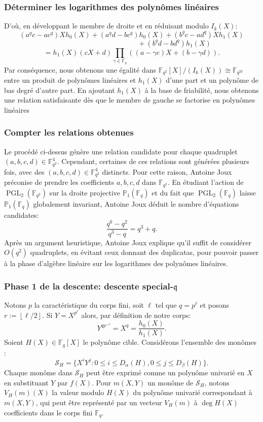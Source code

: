 \documentclass{beamer}
\theoremstyle{definition}
\theoremstyle{remark}
\def\O{O}
\def\gf #1{\mathbb{F}_{#1}}
\def\floor #1{\left\lfloor#1\right\rfloor}
\begin{document}
\begin{frame}
  \frametitle{Déterminer les logarithmes des polynômes linéaires}
  D'où, en développant le membre de droite et en réduisant modulo $I_k(X)$:
  $$(a^qc - ac^q)Xh_0(X) + (a^qd - bc^q)h_0(X) + (b^qc - ad^q)Xh_1(X)$$
  $$\qquad\qquad\qquad\qquad\qquad\qquad + (b^qd - bd^q)h_1(X)$$
  $$= h_1(X)(cX+d) \prod_{\gamma\in\gf{q}}((a-\gamma c)X + (b-\gamma d)).$$
  Par conséquence, nous obtenons une égalité dans $\gf{q^2}[X]/(I_k(X)) \cong \gf{q^{2k}}$ entre un produit de polynômes linéaires et $h_1(X)$ d'une part et un polynôme de bas degré d'autre part. En ajoutant $h_1(X)$ à la base de friabilité, nous obtenons une relation satisfaisante dès que le membre de gauche se factorise en polynômes linéaires
\end{frame}

\begin{frame}
  \frametitle{Compter les relations obtenues}
  Le procédé ci-dessus génère une relation candidate pour chaque quadruplet $(a,b,c,d) \in \gf{q^2}^4$. Cependant, certaines de ces relations sont générées plusieurs fois, avec des $(a,b,c,d)\in\gf{q^2}^4$ distincts. Pour cette raison, Antoine Joux préconise de prendre les coefficients $a,b,c,d$ dans $\gf{q^2}$. En étudiant l'action de $\operatorname{PGL}_2(\gf{q^2})$ sur la droite projective $\mathbb{P}_1(\gf{q})$ et du fait que $\operatorname{PGL}_2(\gf{q})$ laisse $\mathbb{P}_1(\gf{q})$ globalement invariant, Antoine Joux déduit le nombre d'équations candidates: $$\frac{q^6 - q^2}{q^3 - q} = q^3 + q.$$
  Après un argument heuristique, Antoine Joux explique qu'il suffit de considérer $\O(q^2)$ quadruplets, en évitant ceux donnant des duplicatas, pour pouvoir passer à la phase d'algèbre linéaire sur les logarithmes des polynômes linéaires.
\end{frame}

\begin{frame}
  \frametitle{Phase 1 de la descente: descente special-$\mathfrak{q}$}
  Notons $p$ la caractéristique du corps fini, soit $\ell$ tel que $q = p^\ell$ et posons $r := \floor{\ell/2}$. Si $Y = X^{p^{r}}$ alors, par définition de notre corps:
  $$Y^{qp^{-r}} = X^q = \frac{h_0(X)}{h_1(X)}.$$
   Soient $H(X)\in\gf{q}[X]$ le polynôme cible. Considérons l'ensemble des monômes :
   $$\mathcal S_H = \{X^iY^j : 0 \leqslant i \leqslant D_\alpha(H), 0 \leqslant j \leqslant D_\beta(H)\}.$$
   Chaque monôme dans $\mathcal S_H$ peut être exprimé comme un polynôme univarié en $X$ en substituant $Y$ par $f(X)$. Pour $m(X,Y)$ un monôme de $\mathcal S_H$, notons $V_H(m)(X)$ la valeur modulo $H(X)$ du polynôme univarié correspondant à $m(X,Y)$, qui peut être représenté par un vecteur $V_H(m)$ à $\deg H(X)$ coefficients dans le corps fini $\gf{q}$.
\end{frame}
   
\end{document}
